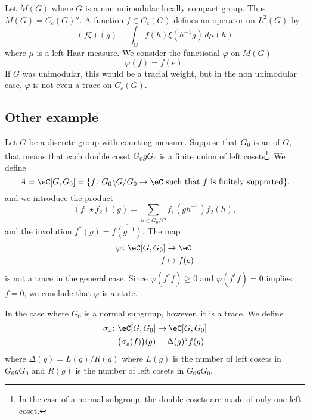 Let $M(G)$ where $G$ is a non unimodular locally compact group. Thus $M(G)=C_c(G)''$. A function $f\in C_c(G)$ defines an operator on $L^2(G)$ by
\begin{equation}
	(f\xi)(g)=\int_{G}f(h)\xi(h^{-1} g)\,d\mu(h)
\end{equation}
where $\mu$ is a left Haar measure. We consider the functional $\varphi$ on $M(G)$
\begin{equation}
	\varphi(f)=f(e).
\end{equation}
If $G$ was unimodular, this would be a tracial weight, but in the non unimodular case, $\varphi$ is not even a trace on $C_c(G)$.

\subsection{Other example}

Let $G$ be a discrete group with counting measure. Suppose that $G_0$ is an  of $G$, that means that each double coset $G_0gG_0$ is a finite union of left cosets\footnote{In the case of a normal subgroup, the double cosets are made of only one left coset.}. We define
\begin{equation}
	A=\eC[G,G_0]=\{ f\colon G_0\backslash G/G_0\to \eC\text{ such that }f \text{ is finitely supported} \},
\end{equation}
and we introduce the product
\begin{equation}
	(f_1\star f_2)(g)=\sum_{h\in G_0/G}f_1(gh^{-1})f_2(h),
\end{equation}
and the involution $f^*(g)=\overline{ f(g^{-1}) }$.  The map
\begin{equation}
	\begin{aligned}
		\varphi\colon \eC[G,G_0] & \to \eC      \\
		f                        & \mapsto f(e)
	\end{aligned}
\end{equation}
is not a trace in the general case. Since $\varphi(f^*f)\geq0$ and $\varphi(f^*f)=0$ implies $f=0$, we conclude that $\varphi$ is a state.

In the case where $G_0$ is a normal subgroup, however, it is a trace. We define
\begin{equation}
	\begin{aligned}
		\sigma_z\colon \eC[G,G_0]  & \to \eC[G,G_0]    \\
		\big( \sigma_z(f) \big)(g) & = \Delta(g)^zf(g)
	\end{aligned}
\end{equation}
where $\Delta(g)=L(g)/R(g)$ where $L(g)$ is the number of left cosets in $G_0gG_0$ and $R(g)$ is the number of left cosets in $G_0gG_0$.

